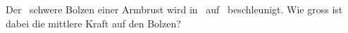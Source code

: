 Der \mBoO\ schwere Bolzen einer Armbrust wird in \tBoO\ auf \vBoO\ beschleunigt. Wie gross ist dabei die mittlere Kraft auf den Bolzen?
